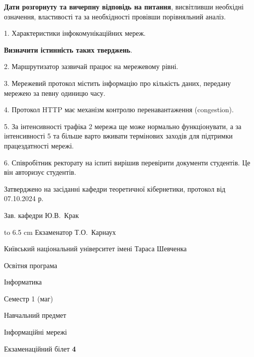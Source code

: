 \documentclass[12pt, ukrainian]{article}
\begin{document}
{
\qquad\textbf{Дати розгорнуту та вичерпну відповідь на питання}, висвітливши необхідні означення, властивості та за необхідності провівши порівняльний аналіз.

1. Характеристики інфокомунікаційних мереж.



\qquad\textbf{Визначити істинність таких тверджень}.

2. Маршрутизатор зазвичай працює на мережевому рівні.


3. Мережевий протокол містить інформацію про кількість даних, передану мережею за певну одиницю часу.


4. Протокол HTTP має механізм контролю перенавантаження (congestion).


5. За інтенсивності трафіка 2 мережа ще може нормально функціонувати, а за інтенсивності 5 та більше варто вживати термінових заходів для підтримки працездатності мережі.


6. Співробітник ректорату на іспиті вирішив перевірити документи студентів. Це він авторизує студентів.

}
{\smallskip\smallskip \begin {scriptsize} Затверджено на засіданні кафедри теоретичної кібернетики, протокол   від   07.10.2024 р.\par\smallskip\smallskip\smallskip\smallskip
{\parbox {6.5 cm} {Зав. кафедри \dotfill Ю.В.~Крак}}\hspace {0.7cm} {\hbox to 6.5 cm { Екзаменатор \dotfill Т.О.~Карнаух}} \end{scriptsize}}
\newpage
{{\begin {scriptsize}\par
{ \center  Київський національний університет імені Тараса Шевченка \par}
{\parbox {5 cm}{Освітня програма \hfill}{\parbox {7 cm}{Інформатика\hfill}}\parbox {6 cm}{\hfill Семестр 1 (маг)}}\par
{\parbox {5 cm} {Навчальний предмет \hfill}\parbox {7 cm}{Інформаційні мережі \hfill}\parbox {6cm}{\hfill}\par}\vspace{-15pt} \end{scriptsize}}{\center Екзаменаційний білет \No \textbf { 4 }\par}}
\end{document}

